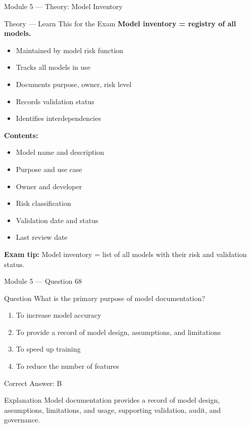 \documentclass[aspectratio=169,10pt]{beamer}
\newcommand{\question}[1]{%
	\begin{block}{Question}
		#1
	\end{block}
}
\newcommand{\options}[4]{%
	\begin{enumerate}[label=\Alph*.,leftmargin=*]
		\item #1
		\item #2
		\item #3
		\item #4
	\end{enumerate}
}
\newcommand{\answerbox}[1]{%
	\begin{exampleblock}{Correct Answer: #1}
	\end{exampleblock}
}
\newcommand{\explain}[1]{%
	\begin{block}{Explanation}
		\small #1
	\end{block}
}
\newcommand{\theory}[1]{%
	\begin{block}{Theory --- Learn This for the Exam}
		\small #1
	\end{block}
}
\begin{document}
	\begin{frame}{Module 5 --- Theory: Model Inventory}
		\theory{
			\textbf{Model inventory = registry of all models.}
			\begin{itemize}
				\item Maintained by model risk function
				\item Tracks all models in use
				\item Documents purpose, owner, risk level
				\item Records validation status
				\item Identifies interdependencies
			\end{itemize}
			\textbf{Contents:}
			\begin{itemize}
				\item Model name and description
				\item Purpose and use case
				\item Owner and developer
				\item Risk classification
				\item Validation date and status
				\item Last review date
			\end{itemize}
			\textbf{Exam tip:} Model inventory = list of all models with their risk and validation status.
		}
	\end{frame}
	
	\begin{frame}{Module 5 --- Question 68}
		\question{What is the primary purpose of model documentation?}
		\options{To increase model accuracy}{To provide a record of model design, assumptions, and limitations}{To speed up training}{To reduce the number of features}
		\answerbox{B}
		\explain{Model documentation provides a record of model design, assumptions, limitations, and usage, supporting validation, audit, and governance.}
	\end{frame}
	
\end{document}
